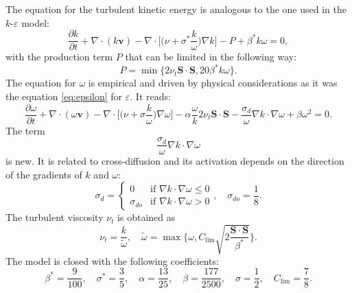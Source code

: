 The equation for the turbulent kinetic energy is analogous to the one used in 
the $k\text{-}\varepsilon$ model:
\begin{equation} \label{eq:komegak}
	\frac{\partial k}{\partial t} + \nabla \cdot (k\mathbf{v}) - \nabla \cdot 
\bigg[\bigg(\nu + \sigma^*\frac{k}{\omega}\bigg) \nabla k\bigg] -P + \beta^* k 
\omega = 0,
\end{equation}
with the production term $P$ that can be limited in the following way:
\begin{equation}
	P = \min \{ 2 \nu_t \mathbf{S} \cdot \mathbf{S}, 20 \beta^* k \omega \}.
\end{equation}
The equation for $\omega$ is empirical and driven by physical considerations as 
it was the equation \eqref{eq:epsilon} for $\varepsilon$. It reads:
\begin{equation} \label{eq:komegaomega}
	\frac{\partial \omega}{\partial t} + \nabla \cdot (\omega \mathbf{v}) - 
	\nabla \cdot \bigg[ \bigg( \nu + \sigma \frac{k}{\omega} \bigg) \nabla 
	\omega 
	\bigg] - \alpha \frac{\omega}{k} 2 \nu_t \mathbf{S} \cdot \mathbf{S} 
	-\frac{\sigma_d}{\omega} \nabla k \cdot 
	\nabla \omega+ \beta \omega^2 = 0.
\end{equation}
The term
\begin{equation}
\frac{\sigma_d}{\omega} \nabla k \cdot \nabla \omega
\end{equation}
is new. It is related to cross-diffusion and its activation depends on the 
direction of the gradients of $k$ and $\omega$:
\begin{equation}
\sigma_d =
\begin{cases}
0 &\text{if $\nabla k \cdot \nabla \omega \leq 0$}\\
\sigma_{do} &\text{if $\nabla k \cdot \nabla \omega > 0$}
\end{cases},
\quad \sigma_{do} = \frac{1}{8}.
\end{equation}
The turbulent viscosity $\nu_t$ is obtained as
\begin{equation}
\nu_t = \frac{k}{\tilde{\omega}}, \quad \tilde{\omega} = \max \Bigg\{ \omega, 
C_\text{lim} \sqrt{ 2\frac{\mathbf{S}\cdot\mathbf{S}}{\beta^*}} \Bigg\}.
\end{equation}
The model is closed with the following coefficients:
\begin{equation}
	\beta^* = \frac{9}{100}, \quad \sigma^* = \frac{3}{5}, \quad \alpha = 
	\frac{13}{25}, \quad \beta = \frac{177}{2500}, \quad \sigma = \frac{1}{2}, 
	\quad C_\text{lim} = \frac{7}{8}.
\end{equation}

